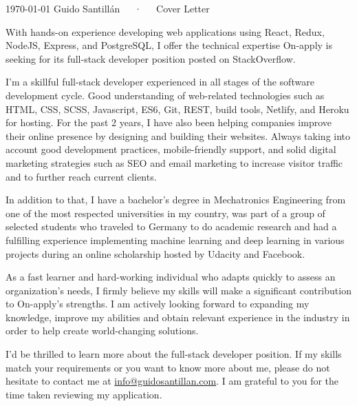 \documentclass[11pt, a4paper]{awesome-cv}
\begin{document}
\makecvheader[C]

\makecvfooter
  {\today}
  {Guido Santillán~~~·~~~Cover Letter}
  {}

\makelettertitle

\begin{cvletter}

With hands-on experience developing web applications using React, Redux, NodeJS, Express, and PostgreSQL, I offer the technical expertise On-apply is seeking for its full-stack developer position posted on StackOverflow.

I'm a skillful full-stack developer experienced in all stages of the software development cycle. Good understanding of web-related technologies such as HTML, CSS, SCSS, Javascript, ES6, Git, REST, build tools, Netlify, and Heroku for hosting. For the past 2 years, I have also been helping companies improve their online presence by designing and building their websites. Always taking into account good development practices, mobile-friendly support, and solid digital marketing strategies such as SEO and email marketing to increase visitor traffic and to further reach current clients.

In addition to that, I have a bachelor's degree in Mechatronics Engineering from one of the most respected universities in my country, was part of a group of selected students who traveled to Germany to do academic research and had a fulfilling experience implementing machine learning and deep learning in various projects during an online scholarship hosted by Udacity and Facebook.

As a fast learner and hard-working individual who adapts quickly to assess an organization’s needs, I firmly believe my skills will make a significant contribution to On-apply's strengths. I am actively looking forward to expanding my knowledge, improve my abilities and obtain relevant experience in the industry in order to help create world-changing solutions.

I'd be thrilled to learn more about the full-stack developer position. If my skills match your requirements or you want to know more about me, please do not hesitate to contact me at \href{mailto:info@guidosantillan.com}{info@guidosantillan.com}. I am grateful to you for the time taken reviewing my application.

\end{cvletter}
\end{document}
